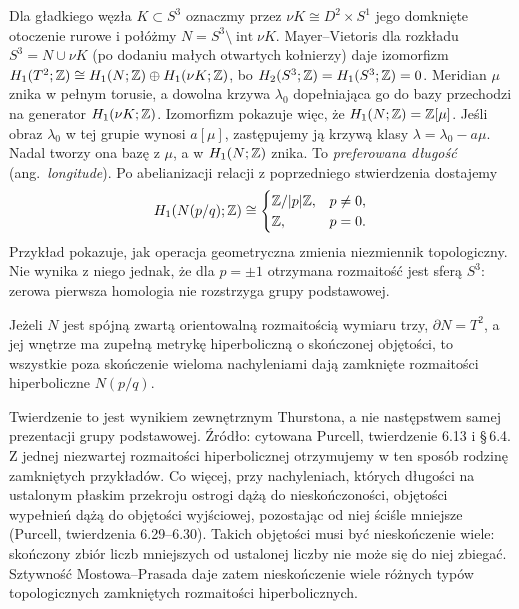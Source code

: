 \begin{przyklad}
\label{prz:thur-dop-dehn-h1}
Dla gładkiego węzła $K\subset S^3$ oznaczmy przez
$\nu K\cong D^2\times S^1$ jego domknięte otoczenie rurowe
i połóżmy $N=S^3\setminus\operatorname{int}\nu K$.
Mayer--Vietoris dla rozkładu $S^3=N\cup\nu K$
(po dodaniu małych otwartych kołnierzy) daje izomorfizm
$H_1(T^2;\mathbb{Z})\cong H_1(N;\mathbb{Z})\oplus H_1(\nu K;\mathbb{Z})$,
bo $H_2(S^3;\mathbb{Z})=H_1(S^3;\mathbb{Z})=0$.
Meridian $\mu$ znika w pełnym torusie, a dowolna krzywa
$\lambda_0$ dopełniająca go do bazy przechodzi na generator
$H_1(\nu K;\mathbb{Z})$. Izomorfizm pokazuje więc, że
$H_1(N;\mathbb{Z})=\mathbb{Z}[\mu]$. Jeśli obraz $\lambda_0$ w tej grupie
wynosi $a[\mu]$, zastępujemy ją krzywą klasy
$\lambda=\lambda_0-a\mu$. Nadal tworzy ona bazę z $\mu$,
a w $H_1(N;\mathbb{Z})$ znika. To \emph{preferowana długość}
(ang.\ \emph{longitude}). Po abelianizacji
relacji z poprzedniego stwierdzenia dostajemy
\[
 H_1(N(p/q);\mathbb{Z})\cong
 \begin{cases}\mathbb{Z}/|p|\mathbb{Z},&p\ne0,\\\mathbb{Z},&p=0.\end{cases}
\]
Przykład pokazuje, jak operacja geometryczna zmienia
niezmiennik topologiczny. Nie wynika z niego jednak,
że dla $p=\pm1$ otrzymana rozmaitość jest sferą $S^3$:
zerowa pierwsza homologia nie rozstrzyga grupy podstawowej.
\end{przyklad}

\begin{twierdzenie}
\label{thm:thur-dop-dehn-hyperbolic}
Jeżeli $N$ jest spójną zwartą orientowalną rozmaitością wymiaru trzy,
$\partial N=T^2$, a jej wnętrze ma zupełną metrykę
hiperboliczną o skończonej objętości, to wszystkie poza
skończenie wieloma nachyleniami dają zamknięte
rozmaitości hiperboliczne $N(p/q)$.
\end{twierdzenie}
Twierdzenie to jest wynikiem zewnętrznym Thurstona,
a nie następstwem samej prezentacji grupy podstawowej.
Źródło: cytowana Purcell, twierdzenie 6.13 i \S\,6.4.
Z jednej niezwartej rozmaitości hiperbolicznej otrzymujemy
w ten sposób rodzinę zamkniętych przykładów.
Co więcej, przy nachyleniach, których długości na ustalonym
płaskim przekroju ostrogi dążą do nieskończoności, objętości
wypełnień dążą do objętości wyjściowej, pozostając od niej
ściśle mniejsze (Purcell, twierdzenia 6.29--6.30).
Takich objętości musi być nieskończenie wiele: skończony zbiór
liczb mniejszych od ustalonej liczby nie może się do niej zbiegać.
Sztywność Mostowa--Prasada daje zatem nieskończenie wiele
różnych typów topologicznych zamkniętych rozmaitości hiperbolicznych.

